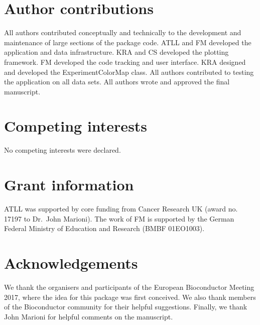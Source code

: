 \documentclass[10pt,a4paper,twocolumn]{article}
\begin{document}
\section*{Author contributions}
All authors contributed conceptually and technically to the development and maintenance of large sections of the package code.
ATLL and FM developed the application and data infrastructure.
KRA and CS developed the plotting framework.
FM developed the code tracking and user interface.
KRA designed and developed the ExperimentColorMap class.
All authors contributed to testing the application on all data sets.
All authors wrote and approved the final manuscript.

\section*{Competing interests}
No competing interests were declared.

\section*{Grant information}
ATLL was supported by core funding from Cancer Research UK (award no. 17197 to Dr.\ John Marioni).
The work of FM is supported by the German Federal Ministry of Education and Research (BMBF 01EO1003).

\section*{Acknowledgements}
We thank the organisers and participants of the European Bioconductor Meeting 2017, where the idea for this package was first conceived.
We also thank members of the Bioconductor community for their helpful suggestions.
Finally, we thank John Marioni for helpful comments on the manuscript.

{\small
}

\bigskip





\end{document}
